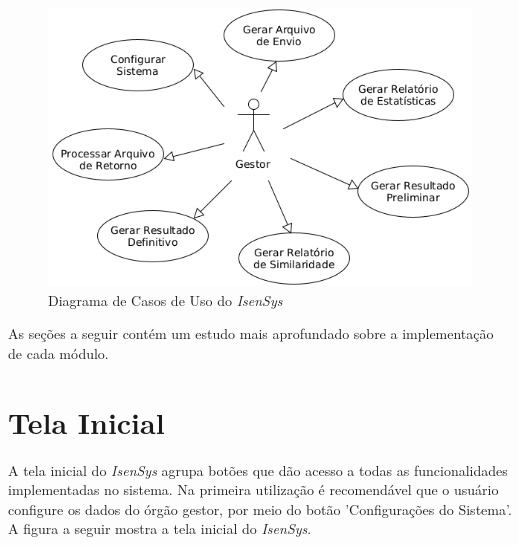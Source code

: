 \documentclass[
	12pt,			%
	openright,		%
	oneside,	
	a4paper,		%
	english,		%
	brazil			%
]{abntex2/abntex2}  %
\begin{document}
		\clearpage
		\begin{figure}[ht]
			\begin{center}
				
				\caption{Diagrama de Casos de Uso do \textit{IsenSys}}
				\includegraphics[scale=0.5]{img/casos-uso-isensys}
				
			\end{center}
		\end{figure}
		
		As seções a seguir contém um estudo mais aprofundado sobre a implementação de cada módulo.

		\section{Tela Inicial}
		
			A tela inicial do \textit{IsenSys} agrupa botões que dão acesso a todas as funcionalidades implementadas no sistema. Na primeira utilização é recomendável que o usuário configure os dados do órgão gestor, por meio do botão 'Configurações do Sistema'. A figura a seguir mostra a tela inicial do \textit{IsenSys}.
			
\end{document}
